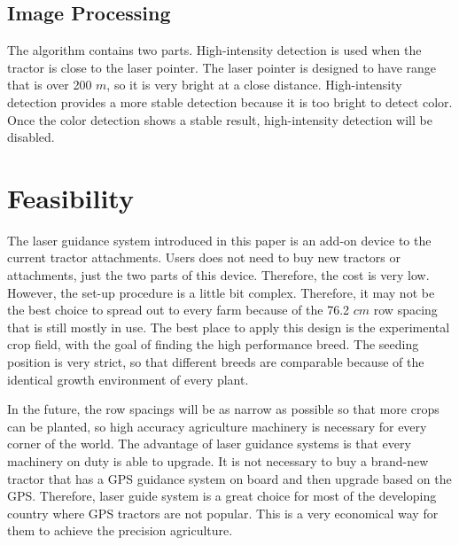 \subsection{Image Processing}
The algorithm contains two parts. High-intensity detection is used when the tractor is close to the laser pointer. The laser pointer is designed to have range that is over 200 $m$, so it is very bright at a close distance. High-intensity detection provides a more stable detection because it is too bright to detect color. Once the color detection shows a stable result, high-intensity detection will be disabled. 


\section{Feasibility}
The laser guidance system introduced in this paper is an add-on device to the current tractor attachments. Users does not need to buy new tractors or attachments, just the two parts of this device. Therefore, the cost is very low. However, the set-up procedure is a little bit complex. Therefore, it may not be the best choice to spread out to every farm because of the 76.2 $cm$ row spacing that is still mostly in use. The best place to apply this design is the experimental crop field, with the goal of finding the high performance breed. The seeding position is very strict, so that different breeds are comparable because of the identical growth environment of every plant. 

In the future, the row spacings will be as narrow as possible so that more crops can be planted, so high accuracy agriculture machinery is necessary for every corner of the world. The advantage of laser guidance systems is that every machinery on duty is able to upgrade. It is not necessary to buy a brand-new tractor that has a GPS guidance system on board and then upgrade based on the GPS. Therefore, laser guide system is a great choice for most of the developing country where GPS tractors are not popular. This is a very economical way for them to achieve the precision agriculture.



